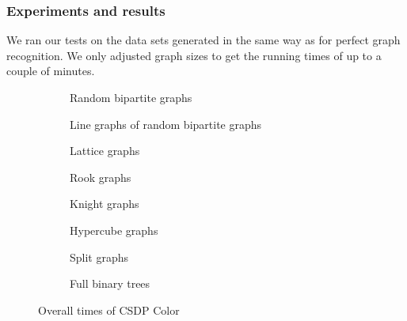 \subsubsection{Experiments and results}

We ran our tests on the data sets generated in the same way as for perfect graph recognition. We only adjusted graph sizes to get the running times of up to a couple of minutes. 

\begin{figure}
  \begin{subfigure}{.5\textwidth}
    \centering
    
    \caption{Random bipartite graphs}
  \end{subfigure}%
  \begin{subfigure}{.5\textwidth}
    \centering
    
    \caption{Line graphs of random bipartite graphs}
  \end{subfigure}
  \begin{subfigure}{.5\textwidth}
    \centering
    
    \caption{Lattice graphs}
  \end{subfigure}%
  \begin{subfigure}{.5\textwidth}
    \centering
    
    \caption{Rook graphs}
  \end{subfigure}
  \begin{subfigure}{.5\textwidth}
    \centering
    
    \caption{Knight graphs}
  \end{subfigure}%
  \begin{subfigure}{.5\textwidth}
    \centering%
    
    \caption{Hypercube graphs}
  \end{subfigure}
  \begin{subfigure}{.5\textwidth}
    \centering
    
    \caption{Split graphs}
  \end{subfigure}%
  \begin{subfigure}{.5\textwidth}
    \centering
    
    \caption{Full binary trees}
  \end{subfigure}
  \caption{Overall times of CSDP Color}
  \label{fig:CSDPLines}
\end{figure}

